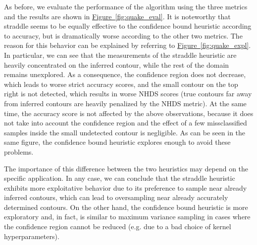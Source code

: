 \documentclass[11pt]{article} %
\newcommand{\figref}[1]{\hyperref[#1]{\mbox{Figure~\ref*{#1}}}}
\begin{document}
As before, we evaluate the performance of the algorithm using the three metrics
and the results are shown in \figref{fig:quake_eval}. It is noteworthy that
straddle seems to be equally effective to the confidence bound heuristic
according to accuracy, but is dramatically worse according to the other two
metrics. The reason for this behavior can be explained by referring to
\figref{fig:quake_expl}. In particular, we can see that the measurements of
the straddle heuristic are heavily concentrated on the inferred contour, while
the rest of the domain remains unexplored. As a consequence, the confidence region
does not decrease, which leads to worse strict accuracy scores, and the small
contour on the top right is not detected, which results in worse NHDS scores
(true contours far away from inferred contours are heavily penalized by the
NHDS metric). At the same time, the accuracy score is not affected by the
above observations, because it does not take into account the confidence
region and the effect of a few missclassified samples inside the small
undetected contour is negligible. As can be seen in the same figure,
the confidence bound heuristic explores enough to avoid these problems.

The importance of this difference between the two heuristics may depend on
the specific application. In any
case, we can conclude that the straddle heuristic exhibits more exploitative
behavior due to its preference to sample near already inferred contours, which
can lead to oversampling near already accurately determined contours. On the
other hand, the confidence bound heuristic is more exploratory and, in fact, is
similar to maximum variance sampling in cases where the confidence region
cannot be reduced (e.g. due to a bad choice of kernel hyperparameters).
\end{document}
